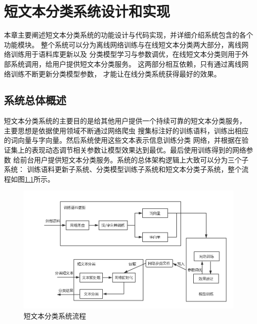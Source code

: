 \documentclass{standalone}
\begin{document}
\chapter{短文本分类系统设计和实现}
本章主要阐述短文本分类系统的功能设计与代码实现，并详细介绍系统包含的各个功能模块。
整个系统可以分为离线网络训练与在线短文本分类两大部分，离线网络训练用于语料库更新以及
分类模型学习与参数调优，在线短文本分类则用于外部系统调用，给用户提供短文本分类服务。
这两部分相互依赖，只有通过离线网络训练不断更新分类模型参数，
才能让在线分类系统获得最好的效果。
\section{系统总体概述}
短文本分类系统的主要目的是给其他用户提供一个持续可靠的短文本分类服务，
主要思想是依据使用领域不断通过网络爬虫
搜集标注好的训练语料，训练出相应的词向量与字向量。然后系统使用这些文本表示信息训练分类
网络，并根据在验证集上的表现动态调节相关参数让模型效果达到最优。最后使用训练得到的网络参数
给前台用户提供短文本分类服务。系统的总体架构逻辑上大致可以分为三个子系统：
训练语料更新子系统、分类模型训练子系统和短文本分类子系统，整个流程如图\ref{system_architecture}所示。
\begin{figure}[h]
    \includegraphics[scale=0.45]{picture/system_architecture.png}
    \caption{短文本分类系统流程}
    \label{system_architecture}
\end{figure}
\end{document}
